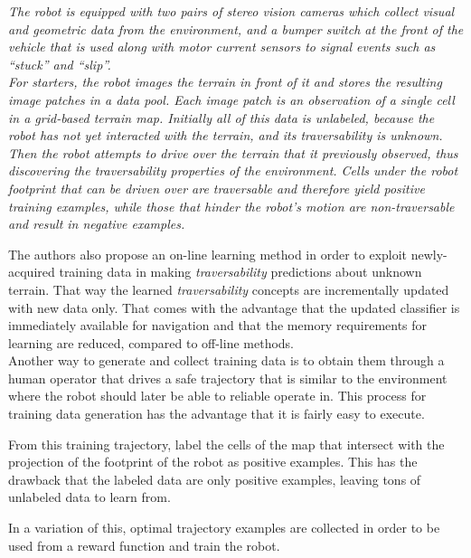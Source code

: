 \documentclass[12pt,a4paper]{report}
\newcommand{\example}{\enquote}
\newcommand{\term}{\textit}
\begin{document}
	\textit{The robot is equipped with two pairs of stereo vision cameras which 
	collect visual and geometric data from the environment, and a bumper switch
	at the front of the vehicle that is used along with motor current sensors to 
	signal events such as \example{stuck} and \example{slip}.
	\\
	For starters, the robot images the terrain in front of it and stores the 
	resulting image patches in a data pool. Each image patch is an observation 
	of a single cell in a grid-based terrain map. Initially all of this data is 
	unlabeled, because the robot has not yet interacted with the terrain, and its 
	\term{traversability} is unknown. 
	\\
	Then the robot attempts to drive over the terrain that it previously 
	observed, thus discovering the \term{traversability} properties of the environment. 
	Cells under the robot footprint that can be driven over are traversable and 
	therefore yield positive training examples, while those that hinder the robot’s 
	motion are non-traversable	and result in negative examples.}
	
	The authors also propose an on-line learning method in order to exploit 
	newly-acquired training data in making \term{traversability} predictions about 
	unknown terrain. That way the learned \term{traversability} concepts are 
	incrementally updated with new data only. That comes with the advantage that the 
	updated classifier is immediately available for navigation and that the 
	memory requirements for learning are reduced, compared to off-line methods.
	\\
	
	
	
	Another way to generate and collect training data is to obtain them through 
	a human operator that drives a safe trajectory that is similar to the 
	environment where the robot should later be able to reliable operate in. 
	This process for training data generation has the advantage that it is fairly 
	easy to execute.
	\par 
	From this training trajectory, \cite{Suger} label the cells of the map that 
	intersect with the projection of the footprint of the robot as positive 
	examples. This has the drawback that the labeled data are only positive 
	examples, leaving tons of unlabeled data to learn from.
	\par 
	In a variation of this, optimal trajectory examples are collected \cite{Wigness} 
	in order to be used from a reward function and train the robot.
	
\end{document}

